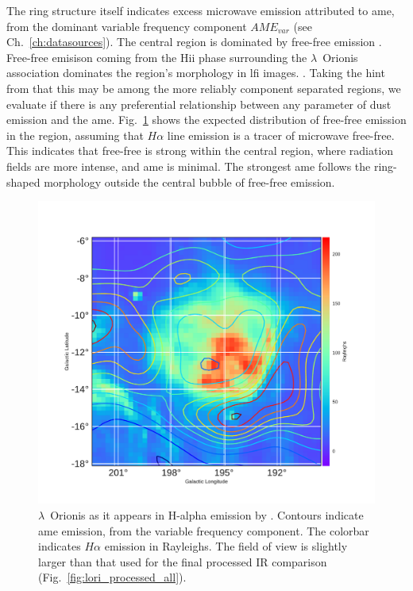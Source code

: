    The ring structure itself indicates excess microwave emission attributed to \gls{ame}, from the dominant variable frequency component $AME_{var}$ (see Ch.~\ref{ch:datasources}). The central region is dominated by free-free emission \citep{aran09, koenig15}. Free-free emisison coming from the Hii phase surrounding the $\lambda$~Orionis association dominates the region's morphology in \gls{lfi} images. \citep{planck15XXV}. Taking the hint from \cite{planck15XXV} that this may be among the more reliably component separated regions, we evaluate if there is any preferential relationship between any parameter of dust emission and the \gls{ame}. Fig.~\ref{fig:LOri_halpha_AMEvarContours} shows the expected distribution of free-free emission in the region, assuming that $H\alpha$ line emission is a tracer of microwave free-free. This indicates that free-free is strong within the central region, where radiation fields are more intense, and \gls{ame} is minimal. The strongest \gls{ame} follows the ring-shaped morphology outside the central bubble of free-free emission.
     \begin{figure}
       \includegraphics[width=\textwidth]{../Plots/ch_lori/LOri_halpha_AMEvarContours.pdf}
       \centering
       \caption{$\lambda$~Orionis as it appears in H-alpha emission by \cite{finkbeiner03}. Contours indicate \gls{ame} emission, from the variable frequency component. The colorbar indicates $H\alpha$ emission in Rayleighs. The field of view is slightly larger than that used for the final processed IR comparison (Fig.~\ref{fig:lori_processed_all}). }
       \label{fig:LOri_halpha_AMEvarContours}
     \end{figure}
